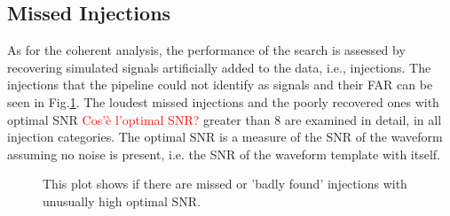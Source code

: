 \documentclass[binding=0.6cm, LaM]{sapthesis}
\newcommand{\fpg}[1]{\textcolor{red}{#1} }
\begin{document}
\subsection{Missed Injections}
	As for the coherent  analysis, the performance of the search is assessed by recovering simulated signals artificially added to the data, i.e., injections.
	The injections that the pipeline could not identify as signals and their FAR can be seen in Fig.\ref{fig:missed_inj}. 
	The loudest missed injections and the poorly recovered ones with optimal SNR \fpg{Cos'\`e l'optimal SNR?} greater than 8 are
        examined in detail, in all injection categories.
	The optimal SNR is a measure of the SNR of the waveform assuming no noise is present, i.e. the SNR of the waveform template with itself. 
         \begin{figure}[t]
          \noindent
          \label{missed_inj}
          \centering
          \caption{ This plot shows if there are missed or 'badly found' injections with unusually high optimal SNR. }
          \label{fig:missed_inj}
        \end{figure}
        
\end{document}
